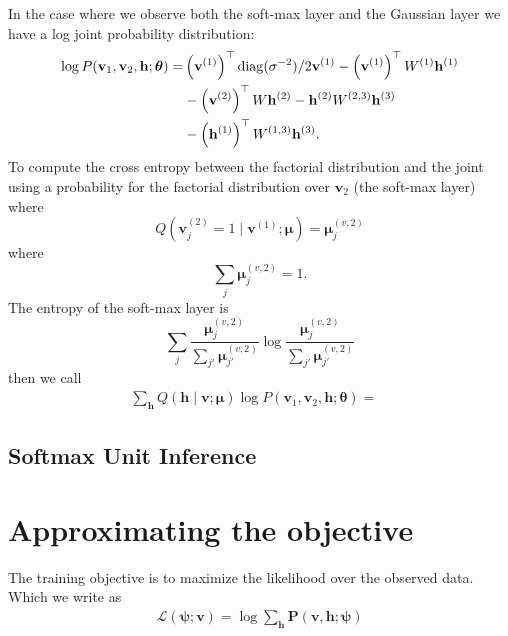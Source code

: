 \documentclass{article} %
\newcommand{\diag}{\mathop{\mathrm{diag}}}
\begin{document}
In the case where we observe both the soft-max layer and the Gaussian layer we have a log joint probability distribution:
\begin{align}
\log P(\mathbf{v}_1,\mathbf{v}_2,\mathbf{h};\boldsymbol{\theta}) =& \left(\mathbf{v}^{(1)}\right)^\top \diag(\sigma^{-2})/2 \mathbf{v}^{(1)} - \left(\mathbf{v}^{(1)}\right)^\top W^{(1)} \mathbf{h}^{(1)} \notag\\
&  - \left(\mathbf{v}^{(2)}\right)^\top W \mathbf{h}^{(2)} - \mathbf{h}^{(2)} W^{(2,3)}\mathbf{h}^{(3)}\notag\\
& - \left(\mathbf{h}^{(1)} \right)^\top W^{(1,3)} \mathbf{h}^{(3)}.
\end{align}
To compute the cross entropy between the factorial distribution and the joint using a probability for the factorial distribution
over $\mathbf{v}_2$ (the soft-max layer) where
\begin{equation}
Q(\mathbf{v}^{(2)}_j = 1\mid \mathbf{v}^{(1)};\boldsymbol{\mu}) = \boldsymbol{\mu}^{(v,2)}_j
\end{equation}
where 
\begin{equation}
\sum_j \boldsymbol{\mu}^{(v,2)}_j = 1.
\end{equation}
The entropy of the soft-max layer is
\begin{equation}
\sum_j \frac{\boldsymbol{\mu}^{(v,2)}_j}{\sum_{j'}\boldsymbol{\mu}^{(v,2)}_{j'}} \log \frac{\boldsymbol{\mu}^{(v,2)}_j}{\sum_{j'}\boldsymbol{\mu}^{(v,2)}_{j'}}
\end{equation}
then we call
\begin{align}
\sum_{\mathbf{h}} Q(\mathbf{h}\mid \mathbf{v};\boldsymbol{\mu})\log P(\mathbf{v}_1,\mathbf{v}_2,\mathbf{h};\boldsymbol{\theta}) =&
\end{align}

\subsection{Softmax Unit Inference}




\section{Approximating the objective}

The training objective is to maximize the likelihood over the observed data.  Which we write as
\begin{align}
\mathcal{L}(\boldsymbol{\psi};\mathbf{v}) = \log \sum_{\mathbf{h}} \mathbf{P}(\mathbf{v},\mathbf{h};\boldsymbol{\psi})
\end{align}
\end{document}
